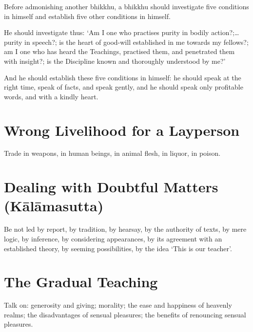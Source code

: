 Before admonishing another bhikkhu, a bhikkhu should investigate five conditions
in himself and establish five other conditions in himself.

He should investigate thus: ‘Am I one who practises purity in bodily action?;…
purity in speech?; is the heart of good-will established in me towards my
fellows?; am I one who has heard the Teachings, practised them, and penetrated
them with insight?; is the Discipline known and thoroughly understood by me?’

And he should establish these five conditions in himself: he should speak at the
right time, speak of facts, and speak gently, and he should speak only
profitable words, and with a kindly heart.\\
\mbox{}

\section*{Wrong Livelihood for a Layperson}

Trade in weapons, in human beings, in animal flesh, in liquor, in poison.


\vspace*{-\baselineskip}

\section*{Dealing with Doubtful Matters (Kālāmasutta)}

Be not led by report, by tradition, by hearsay, by the authority of texts, by
mere logic, by inference, by considering appearances, by its agreement with an
established theory, by seeming possibilities, by the idea ‘This is our teacher’.


\vspace*{-\baselineskip}

\section*{The Gradual Teaching}

Talk on: generosity and giving; morality; the ease and happiness of heavenly
realms; the disadvantages of sensual pleasures; the benefits of renouncing
sensual pleasures.


\vspace*{-\baselineskip}

